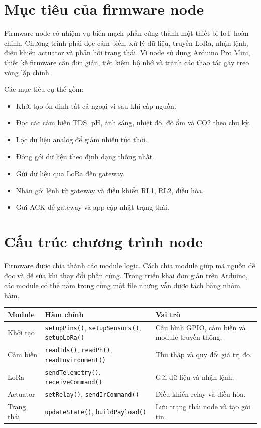 \section{Mục tiêu của firmware node}
Firmware node có nhiệm vụ biến mạch phần cứng thành một thiết bị IoT hoàn chỉnh. Chương trình phải đọc cảm biến, xử lý dữ liệu, truyền LoRa, nhận lệnh, điều khiển actuator và phản hồi trạng thái. Vì node sử dụng Arduino Pro Mini, thiết kế firmware cần đơn giản, tiết kiệm bộ nhớ và tránh các thao tác gây treo vòng lặp chính.

Các mục tiêu cụ thể gồm:
\begin{itemize}
    \item Khởi tạo ổn định tất cả ngoại vi sau khi cấp nguồn.
    \item Đọc các cảm biến TDS, pH, ánh sáng, nhiệt độ, độ ẩm và CO2 theo chu kỳ.
    \item Lọc dữ liệu analog để giảm nhiễu tức thời.
    \item Đóng gói dữ liệu theo định dạng thống nhất.
    \item Gửi dữ liệu qua LoRa đến gateway.
    \item Nhận gói lệnh từ gateway và điều khiển RL1, RL2, điều hòa.
    \item Gửi ACK để gateway và app cập nhật trạng thái.
\end{itemize}

\section{Cấu trúc chương trình node}
Firmware được chia thành các module logic. Cách chia module giúp mã nguồn dễ đọc và dễ sửa khi thay đổi phần cứng. Trong triển khai đơn giản trên Arduino, các module có thể nằm trong cùng một file nhưng vẫn được tách bằng nhóm hàm.

\begin{longtable}{|p{3.5cm}|p{5cm}|p{4.6cm}|}
\hline
\textbf{Module} & \textbf{Hàm chính} & \textbf{Vai trò} \\
\hline
Khởi tạo & \texttt{setupPins()}, \texttt{setupSensors()}, \texttt{setupLoRa()} & Cấu hình GPIO, cảm biến và module truyền thông. \\
\hline
Cảm biến & \texttt{readTds()}, \texttt{readPh()}, \texttt{readEnvironment()} & Thu thập và quy đổi giá trị đo. \\
\hline
LoRa & \texttt{sendTelemetry()}, \texttt{receiveCommand()} & Gửi dữ liệu và nhận lệnh. \\
\hline
Actuator & \texttt{setRelay()}, \texttt{sendIrCommand()} & Điều khiển relay và điều hòa. \\
\hline
Trạng thái & \texttt{updateState()}, \texttt{buildPayload()} & Lưu trạng thái node và tạo gói tin. \\
\hline
\end{longtable}

